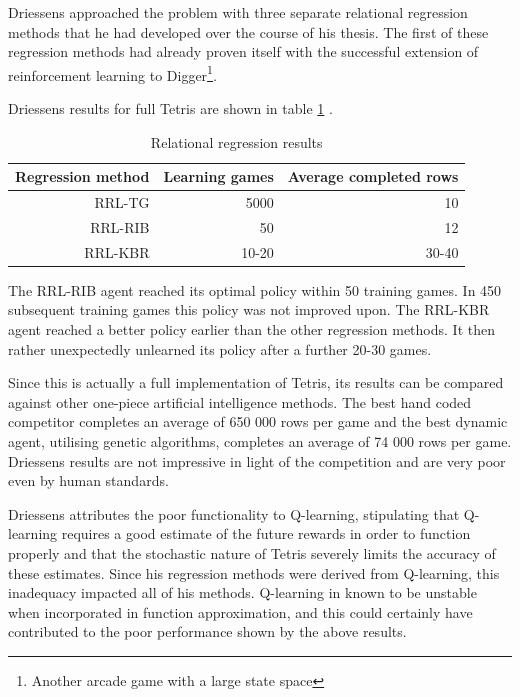\documentclass{rucsthesis}
\begin{document}
Driessens approached the problem with three separate relational regression methods \citep{kurt} that he had developed over the course of his thesis. The first of these regression methods had already proven itself with the successful extension of reinforcement learning to Digger\footnote{Another arcade game with a large state space}. 

Driessens results for full Tetris are shown in table \ref{tbl:driessens} .

\begin{table}[h]
\centering
\begin{tabular}{|r|r|r|}
\hline
Regression method & Learning games & Average completed rows \\
\hline
RRL-TG	&	5000	& 	10   \\
\hline
RRL-RIB  &  50  & 12  \\
\hline
RRL-KBR  &  10-20  & 30-40  \\
\hline
\end{tabular}
\caption{Relational regression results \citep{kurt}}
\label{tbl:driessens}
\end{table}

The RRL-RIB agent reached its optimal policy within 50 training games. In 450 subsequent training games this policy was not improved upon. The RRL-KBR agent reached a better policy earlier than the other regression methods. It then rather unexpectedly unlearned its policy after a further 20-30 games.

Since this is actually a full implementation of Tetris, its results can be compared against other one-piece artificial intelligence methods. The best hand coded competitor completes an average of 650 000 rows per game and the best dynamic agent, utilising genetic algorithms, completes an average of 74 000 rows per game\citep{tetstand}. Driessens results are not impressive in light of the competition and are very poor even by human standards.

Driessens attributes the poor functionality to Q-learning, stipulating that Q-learning requires a good estimate of the future rewards in order to function properly and that the stochastic nature of Tetris severely limits the accuracy of these estimates. Since his regression methods were derived from Q-learning, this inadequacy impacted all of his methods. Q-learning in known to be unstable \citep{keepaway,thrun93issues} when incorporated in function approximation, and this could certainly have contributed to the poor performance shown by the above results.
\end{document}
